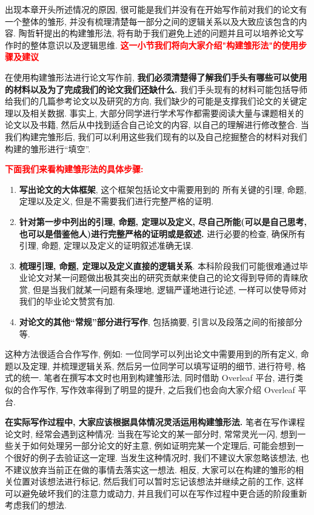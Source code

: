 \documentclass{formatBook}
\newcommand{\XG}[1]{\textcolor{red}{#1}}
\begin{document}
{出现本章开头所述情况的原因}, 很可能是我们并没有在开始写作前对我们的论文有一个整体的雏形, 并没有梳理清楚每一部分之间的逻辑关系以及大致应该包含的内容. 陶哲轩提出的构建雏形法, 将有助于我们避免上述的问题并且可以培养论文写作时的整体意识以及逻辑思维. \XG{\textbf{这一小节我们将向大家介绍"构建雏形法"的使用步骤及建议}} \par
在使用构建雏形法进行论文写作前, \textbf{我们必须清楚得了解我们手头有哪些可以使用的材料以及为了完成我们的论文我们还缺什么.} 我们手头现有的材料可能包括导师给我们的几篇参考论文以及研究的方向, 我们缺少的可能是支撑我们论文的关键定理以及相关数据. 事实上, 大部分同学进行学术写作都需要阅读大量与课题相关的论文以及书籍, 然后从中找到适合自己论文的内容, 以自己的理解进行修改整合. 当我们构建完雏形后, 我们可以利用这些我们现有的以及自己挖掘整合的材料对我们构建的雏形进行{``}填空''. \par
\XG{\textbf{下面我们来看构建雏形法的具体步骤: }}
\begin{enumerate}
    \item \textbf{写出论文的大体框架}, 这个框架包括论文中需要用到的 所有关键的引理, 命题, 定理以及定义, 但是不需要我们进行完整严格的证明.
    \item \textbf{针对第一步中列出的引理, 命题, 定理以及定义, 尽自己所能(可以是自己思考, 也可以是借鉴他人)进行完整严格的证明或是叙述. }进行必要的检查, 确保所有引理, 命题, 定理以及定义的证明叙述准确无误.
    \item \textbf{梳理引理, 命题, 定理以及定义直接的逻辑关系}. 本科阶段我们可能很难通过毕业论文对某一问题做出极其突出的研究贡献来使自己的论文得到导师的青睐欣赏, 但是当我们就某一问题有条理地, 逻辑严谨地进行论述, 一样可以使导师对我们的毕业论文赞赏有加.
    \item \textbf{对论文的其他{``}常规''部分进行写作}, 包括摘要, 引言以及段落之间的衔接部分等.
\end{enumerate}
\par
这种方法很适合合作写作, 例如: 一位同学可以列出论文中需要用到的所有定义, 命题以及定理, 并梳理逻辑关系, 然后另一位同学可以填写证明的细节, 进行符号, 格式的统一. 笔者在撰写本文时也用到构建雏形法, 同时借助 Overleaf 平台, 进行类似的合作写作, 写作效率得到了明显的提升, 之后我们也会向大家介绍 Overleaf 平台. \par
\textbf{在实际写作过程中, 大家应该根据具体情况灵活运用构建雏形法. }笔者在写作课程论文时, 经常会遇到这种情况: 当我在写论文的某一部分时, 常常灵光一闪, 想到一些关于如何处理另一部分论文的好主意, 例如证明完某一个定理后, 可能会想到一个很好的例子去验证这一定理. 当发生这种情况时, 我们不建议大家忽略该想法, 也不建议放弃当前正在做的事情去落实这一想法. 相反, 大家可以在构建的雏形的相关位置对该想法进行标记, 然后我们可以暂时忘记该想法并继续之前的工作, 这样可以避免破坏我们的注意力或动力, 并且我们可以在写作过程中更合适的阶段重新考虑我们的想法.
\end{document}
